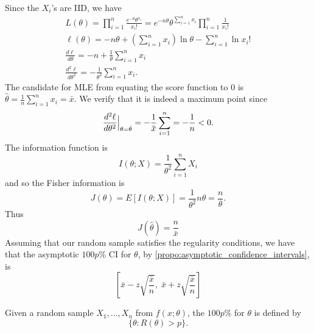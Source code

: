 \documentclass[notoc,notitlepage]{tufte-book}
\begin{document}
\begin{solution}
  Since the $X_i$'s are IID, we have
  \begin{gather*}
    L(\theta) = \prod_{i=1}^{n} \frac{e^{-\theta} \theta^{x_i}}{x_i!} = e^{-n\theta} \theta^{\sum\limits_{i=1}^{n} x_i} \prod_{i=1}^{n} \frac{1}{x_i!} \\
    \ell(\theta) = -n \theta + \left( \sum_{i=1}^{n} x_i \right) \ln \theta - \sum_{i=1}^{n} \ln x_i! \\
    \frac{d \ell}{d \theta} = -n + \frac{1}{\theta} \sum_{i=1}^{n} x_i \\
    \frac{d^2 \ell}{d\theta^2} = - \frac{1}{\theta^2} \sum_{i=1}^{n} x_i.
  \end{gather*}
  The candidate for MLE from equating the score function to $0$ is $\hat{\theta} = \frac{1}{n} \sum_{i=1}^{n} x_i = \bar{x}$. We verify that it is indeed a maximum point since
  \begin{equation*}
    \frac{d^2 \ell}{d \theta^2} \at{\theta = \hat{\theta}}{} = - \frac{1}{\bar{x}} \sum_{i=1}^{n} = - \frac{1}{n} < 0.
  \end{equation*}
  The information function is
  \begin{equation*}
    I(\theta; X) = \frac{1}{\theta^2} \sum_{i=1}^{n} X_i
  \end{equation*}
  and so the Fisher information is
  \begin{equation*}
    J(\theta) = E[ I(\theta; X) ] = \frac{1}{\theta^2} n \theta = \frac{n}{\theta}.
  \end{equation*}
  Thus
  \begin{equation*}
    J(\hat{\theta}) = \frac{n}{\bar{x}}
  \end{equation*}
  Assuming that our random sample satisfies the regularity conditions, we have that the asymptotic $100p\%$ CI for $\theta$, by \cref{propo:asymptotic_confidence_intervals}, is
  \begin{equation*}
    \left[ \bar{x} - z \sqrt{\frac{\bar{x}}{n}}, \; \bar{x} + z \sqrt{\frac{\bar{x}}{n}} \right]
  \end{equation*}
\end{solution}

\begin{defn}
\label{defn:likelihood_interval}
  Given a random sample $X_1, ..., X_n$ from $f(x; \theta)$, the $100p\%$  for $\theta$ is defined by
  \begin{equation*}
    \{ \theta : R(\theta) > p \}.
  \end{equation*}
\end{defn}
\end{document}
